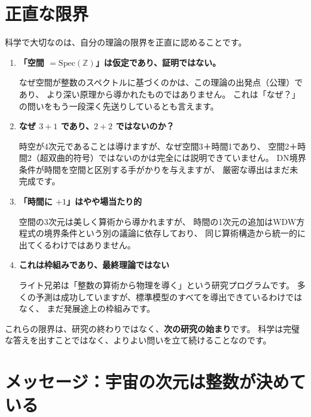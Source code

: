 \documentclass[12pt,a4paper]{article}
\begin{document}
\section{正直な限界}

科学で大切なのは、自分の理論の限界を正直に認めることです。

\begin{honesty}[認めるべき限界]
\begin{enumerate}[label=\textbf{\arabic*.}]
  \item \textbf{「空間 $= \mathrm{Spec}(\mathbb{Z})$」は仮定であり、証明ではない。}

  なぜ空間が整数のスペクトルに基づくのかは、この理論の出発点（公理）であり、
  より深い原理から導かれたものではありません。
  これは「なぜ？」の問いをもう一段深く先送りしているとも言えます。

  \item \textbf{なぜ $3+1$ であり、$2+2$ ではないのか？}

  時空が4次元であることは導けますが、なぜ空間3＋時間1であり、
  空間2＋時間2（超双曲的符号）ではないのかは完全には説明できていません。
  DN境界条件が時間を空間と区別する手がかりを与えますが、
  厳密な導出はまだ未完成です。

  \item \textbf{「時間に $+1$」はやや場当たり的}

  空間の3次元は美しく算術から導かれますが、
  時間の1次元の追加はWDW方程式の境界条件という別の議論に依存しており、
  同じ算術構造から統一的に出てくるわけではありません。

  \item \textbf{これは枠組みであり、最終理論ではない}

  ライト兄弟は「整数の算術から物理を導く」という研究プログラムです。
  多くの予測は成功していますが、標準模型のすべてを導出できているわけではなく、
  まだ発展途上の枠組みです。
\end{enumerate}
\end{honesty}

これらの限界は、研究の終わりではなく、\textbf{次の研究の始まり}です。
科学は完璧な答えを出すことではなく、よりよい問いを立て続けることなのです。

\section{メッセージ：宇宙の次元は整数が決めている}
\end{document}
